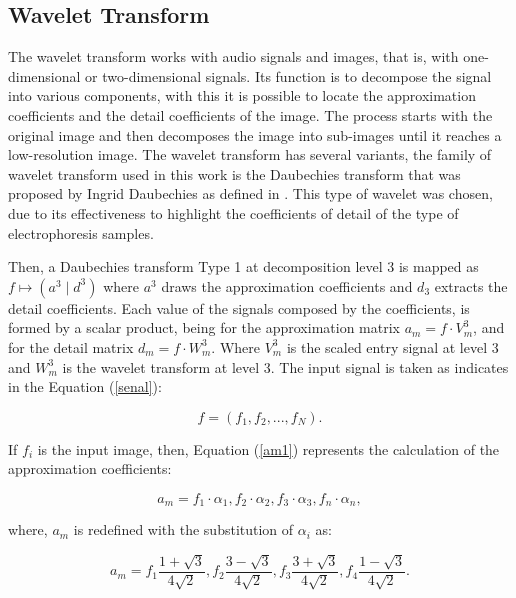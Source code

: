 \documentclass[a4paper]{llncs}
\begin{document}
\subsection{Wavelet Transform}
The wavelet transform works with audio signals and images, that is, with one-dimensional or two-dimensional signals. Its function is to decompose the signal into various components, with this it is possible to locate the approximation coefficients and the detail coefficients of the image. The process starts with the original image and then decomposes the image into sub-images until it reaches a low-resolution image. The wavelet transform has several variants, the family of wavelet transform used in this work is the Daubechies transform that was proposed by Ingrid Daubechies as defined in \cite{Walker}. This type of wavelet was chosen, due to its effectiveness to highlight the coefficients of detail of the type of electrophoresis samples.

Then, a Daubechies transform Type 1 at decomposition level 3 is mapped as $f \mapsto (a^{3} \mid d^{3}) $ where $a^3$ draws the approximation coefficients and $d_{3} $ extracts the detail coefficients. Each value of the signals composed by the coefficients, is formed by a scalar product, being for the approximation matrix $ a_m = f \cdot V_{m}^3$, and for the detail matrix $ d_{m} = f \cdot W_ {m}^{3} $. Where $V_{m}^{3} $ is the scaled entry signal at level 3 and $ W_{m}^{3} $ is the wavelet transform at  level 3. The input signal is taken as indicates in the Equation (\ref{senal}):

\begin{equation}
f=(f_1,f_2,...,f_N).
\label{senal}
\end{equation}

\noindent If $f_i$ is the input image, then, Equation (\ref{am1}) represents the calculation of the approximation coefficients:

\begin{equation}
a_m = f_1 \cdot \alpha_1,  f_2 \cdot \alpha_2,  f_3 \cdot \alpha_3,  f_n \cdot \alpha_n,
\label{am1}
\end{equation}

\noindent where, $a_m$ is redefined with the substitution of $\alpha_i$ as:

\begin{equation}
a_{m} =  f_{1} \frac{1+\sqrt{3}}{4 \sqrt{2}}, f_{2} \frac{3-\sqrt{3}}{4 \sqrt{2}}, 
f_{3} \frac{3+\sqrt{3}}{4 \sqrt{2}}, f_{4} \frac{1-\sqrt{3}}{4 \sqrt{2}}.
\label{am2}
\end{equation}
\end{document}

